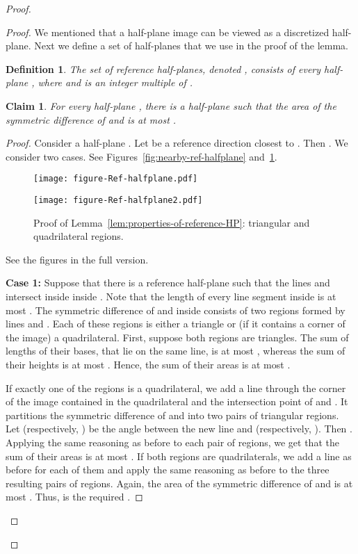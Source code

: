 \documentclass[11pt,english]{article}
\newtheorem{claim}[theorem]{Claim}
\newtheorem{definition}{Definition}[section]
\numberwithin{figure}{section}
\begin{document}
\begin{proof}
{\begin{proof}
We mentioned that a half-plane image can be viewed as a discretized half-plane. Next we define a set of half-planes that we use in the proof of the lemma.
\begin{definition}\label{def:hp}
The set of reference half-planes, denoted , consists of every half-plane , where  and  is an integer multiple of . 
\end{definition}
\begin{claim}\label{cl:properties-of-reference-HP}
For every half-plane , there is a half-plane  such that the area of the symmetric difference of  and  is at most .
\end{claim}
\begin{proof}
Consider a half-plane . Let  be a reference direction closest to . Then . 
We consider two cases. 
\ifnum{}
See Figures~\ref{fig:nearby-ref-halfplane} and~\ref{fig:nearby-ref-halfplane2}.

\begin{figure}[ht]
\begin{minipage}[b]{0.45\linewidth}
\centering
\texttt{[image: figure-Ref-halfplane.pdf]}
\caption{Proof of Lemma~\ref{lem:properties-of-reference-HP}: triangular regions.}
\label{fig:nearby-ref-halfplane}
\end{minipage}
\hspace{0.1\linewidth}
\begin{minipage}[b]{0.45\linewidth}
\centering
\texttt{[image: figure-Ref-halfplane2.pdf]}
\caption{Proof of Lemma~\ref{lem:properties-of-reference-HP}: triangular and quadrilateral regions.}
\label{fig:nearby-ref-halfplane2}
\end{minipage}
\end{figure}

\else
See the figures in the {\color{black} full version}.
\fi

{\bf Case 1:} Suppose that there is a reference half-plane  such that the lines  and  intersect inside inside . Note that the length of every line segment inside  is at most . The symmetric difference of  and  inside  consists of two regions
formed by lines  and . Each of these regions is either a triangle or (if it contains a corner of the image) a quadrilateral. First, suppose both regions are triangles. The sum of lengths of their bases, that lie on the same line, is at most , whereas the sum of their heights is at most . Hence, the sum of their areas is at most .

If exactly one of the regions is a quadrilateral, we add a line through the corner of the image contained in the quadrilateral and the intersection point of   and . It partitions the symmetric difference of  and  into two pairs of triangular regions. Let  (respectively, ) be the angle between the new line and  (respectively, ). Then . Applying the same reasoning as before to each pair of regions, we get that the sum of their areas is at most .
If both regions are quadrilaterals, we add a line as before for each of them and apply the same reasoning as before to the three resulting pairs of regions. Again, the area of the symmetric difference of  and  is at most . Thus,  is the required .


\end{proof}
\end{proof}}
\end{proof}
\end{document}
